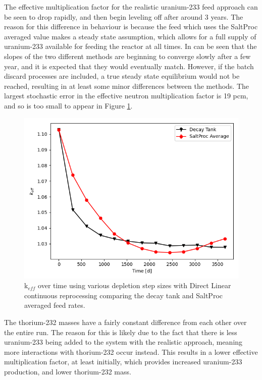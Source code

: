 The effective multiplication factor for the realistic uranium-233 feed approach can be seen to drop rapidly, and then begin leveling off after around 3 years.
The reason for this difference in behaviour is because the feed which uses the SaltProc averaged value makes a steady state assumption, which allows for a full supply of uranium-233 available for feeding the reactor at all times.
In can be seen that the slopes of the two different methods are beginning to converge slowly after a few year, and it is expected that they would eventually match.
However, if the batch discard processes are included, a true steady state equilibrium would not be reached, resulting in at least some minor differences between the methods.
The largest stochastic error in the effective neutron multiplication factor is 19 pcm, and so is too small to appear in Figure \ref{fig:DL-cont-k-adv}.

\begin{figure}[H]
  \centering
  \includegraphics[scale=0.7]{images/adv-keff.png}
  \caption{k$_{eff}$ over time using various depletion step sizes with Direct Linear continuous reprocessing comparing the decay tank and SaltProc averaged feed rates.}
   \label{fig:DL-cont-k-adv}
\end{figure}

The thorium-232 masses have a fairly constant difference from each other over the entire run. The reason for this is likely due to the fact that there is less uranium-233 being added to the system with the realistic approach, meaning more interactions with thorium-232 occur instead. This results in a lower effective multiplication factor, at least initially, which provides increased uranium-233 production, and lower thorium-232 mass.

